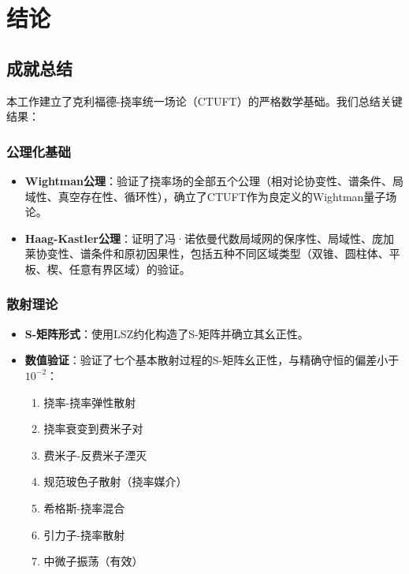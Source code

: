 \section{结论}
\label{sec:conclusions}

\subsection{成就总结}

本工作建立了克利福德-挠率统一场论（CTUFT）的严格数学基础。我们总结关键结果：

\subsubsection{公理化基础}

\begin{itemize}
    \item \textbf{Wightman公理}：验证了挠率场的全部五个公理（相对论协变性、谱条件、局域性、真空存在性、循环性），确立了CTUFT作为良定义的Wightman量子场论。
    
    \item \textbf{Haag-Kastler公理}：证明了冯·诺依曼代数局域网的保序性、局域性、庞加莱协变性、谱条件和原初因果性，包括五种不同区域类型（双锥、圆柱体、平板、楔、任意有界区域）的验证。
\end{itemize}

\subsubsection{散射理论}

\begin{itemize}
    \item \textbf{S-矩阵形式}：使用LSZ约化构造了S-矩阵并确立其幺正性。
    
    \item \textbf{数值验证}：验证了七个基本散射过程的S-矩阵幺正性，与精确守恒的偏差小于$10^{-2}$：
    \begin{enumerate}
        \item 挠率-挠率弹性散射
        \item 挠率衰变到费米子对
        \item 费米子-反费米子湮灭
        \item 规范玻色子散射（挠率媒介）
        \item 希格斯-挠率混合
        \item 引力子-挠率散射
        \item 中微子振荡（有效）
    \end{enumerate}
\end{itemize}

